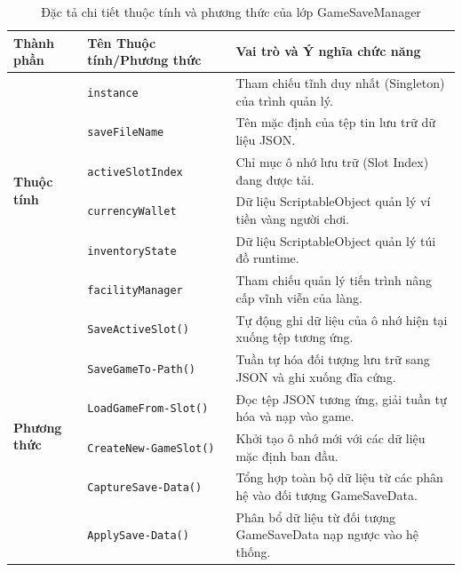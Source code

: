 \documentclass[../DoAn.tex]{subfiles}
\begin{document}
\begin{table}[H]
\centering
\begin{tabular}{|p{2.2cm}|p{4.8cm}|p{8.0cm}|}
\hline
\textbf{Thành phần} & \textbf{Tên Thuộc tính/Phương thức} & \textbf{Vai trò và Ý nghĩa chức năng} \\ \hline
\multirow{6}{*}{\textbf{Thuộc tính}} & \texttt{instance} & Tham chiếu tĩnh duy nhất (Singleton) của trình quản lý. \\ \cline{2-3}
 & \texttt{saveFileName} & Tên mặc định của tệp tin lưu trữ dữ liệu JSON. \\ \cline{2-3}
 & \texttt{activeSlotIndex} & Chỉ mục ô nhớ lưu trữ (Slot Index) đang được tải. \\ \cline{2-3}
 & \texttt{currencyWallet} & Dữ liệu ScriptableObject quản lý ví tiền vàng người chơi. \\ \cline{2-3}
 & \texttt{inventoryState} & Dữ liệu ScriptableObject quản lý túi đồ runtime. \\ \cline{2-3}
 & \texttt{facilityManager} & Tham chiếu quản lý tiến trình nâng cấp vĩnh viễn của làng. \\ \hline
\multirow{6}{*}{\textbf{Phương thức}} & \texttt{SaveActiveSlot()} & Tự động ghi dữ liệu của ô nhớ hiện tại xuống tệp tương ứng. \\ \cline{2-3}
 & \texttt{SaveGameTo-}\newline\texttt{Path()} & Tuần tự hóa đối tượng lưu trữ sang JSON và ghi xuống đĩa cứng. \\ \cline{2-3}
 & \texttt{LoadGameFrom-}\newline\texttt{Slot()} & Đọc tệp JSON tương ứng, giải tuần tự hóa và nạp vào game. \\ \cline{2-3}
 & \texttt{CreateNew-}\newline\texttt{GameSlot()} & Khởi tạo ô nhớ mới với các dữ liệu mặc định ban đầu. \\ \cline{2-3}
 & \texttt{CaptureSave-}\newline\texttt{Data()} & Tổng hợp toàn bộ dữ liệu từ các phân hệ vào đối tượng GameSaveData. \\ \cline{2-3}
 & \texttt{ApplySave-}\newline\texttt{Data()} & Phân bổ dữ liệu từ đối tượng GameSaveData nạp ngược vào hệ thống. \\ \hline
\end{tabular}
\caption{Đặc tả chi tiết thuộc tính và phương thức của lớp GameSaveManager}
\label{table:save_manager_details}
\end{table}
\end{document}

